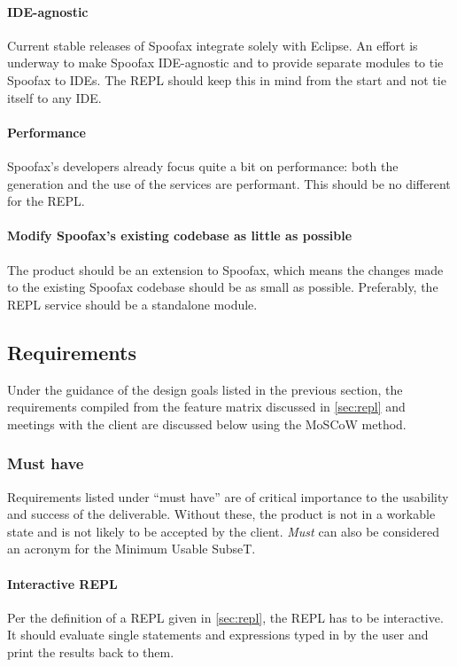 \paragraph{IDE-agnostic} Current stable releases of Spoofax integrate solely with
Eclipse. An effort is underway to make Spoofax IDE-agnostic and to
provide separate modules to tie Spoofax to IDEs. The REPL should keep this in
mind from the start and not tie itself to any IDE.

\paragraph{Performance} Spoofax's developers already focus quite a bit on
performance: both the generation and the use of the services are performant.
This should be no different for the REPL.

\paragraph{Modify Spoofax's existing codebase as little as possible} The product
should be an extension to Spoofax, which means the changes made to the existing
Spoofax codebase should be as small as possible. Preferably, the REPL service
should be a standalone module.

\subsection{Requirements}
\label{ssec:requirements}

Under the guidance of the design goals listed in the previous section, the
requirements compiled from the feature matrix discussed in \cref{sec:repl} and
meetings with the client are discussed below using the MoSCoW method.

\subsubsection{Must have}

Requirements listed under ``must have'' are of critical importance to the
usability and success of the deliverable. Without these, the product is not in a
workable state and is not likely to be accepted by the client. \emph{Must} can
also be considered an acronym for the Minimum Usable SubseT.

\paragraph{Interactive REPL} Per the definition of a REPL given in
\cref{sec:repl}, the REPL has to be interactive. It should evaluate single
statements and expressions typed in by the user and print the results back to
them.

